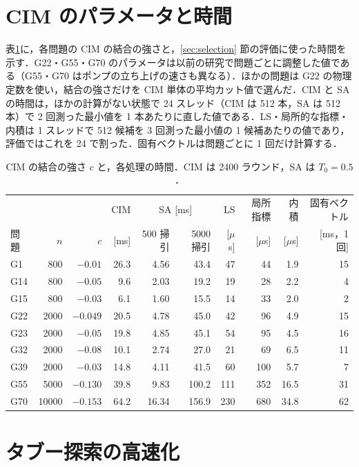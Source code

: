 \appendix

\section{CIM のパラメータと時間}\label{app:timing}

表\ref{tab:timing}に，各問題の CIM の結合の強さと，\ref{sec:selection} 節の評価に使った時間を示す．G22・G55・G70 のパラメータは以前の研究で問題ごとに調整した値である（G55・G70 はポンプの立ち上げの速さも異なる）．ほかの問題は G22 の物理定数を使い，結合の強さだけを CIM 単体の平均カット値で選んだ．CIM と SA の時間は，ほかの計算がない状態で 24 スレッド（CIM は 512 本，SA は 512 本）で 2 回測った最小値を 1 本あたりに直した値である．LS・局所的な指標・内積は 1 スレッドで 512 候補を 3 回測った最小値の 1 候補あたりの値であり，評価ではこれを 24 で割った．固有ベクトルは問題ごとに 1 回だけ計算する．

\begin{table}[h]
\centering
\caption{CIM の結合の強さ $c$ と，各処理の時間．CIM は 2400 ラウンド，SA は $T_0=0.5$．}\label{tab:timing}
\small
\begin{tabular}{lrrrrrrrrr}
\toprule
 & & & CIM & \multicolumn{2}{c}{SA [ms]} & LS & 局所指標 & 内積 & 固有ベクトル \\
問題 & $n$ & $c$ & [ms] & 500 掃引 & 5000 掃引 & [$\mu$s] & [$\mu$s] & [$\mu$s] & [ms，1 回] \\
\midrule
G1 & 800 & $-0.01$ & 26.3 & 4.56 & 43.4 & 47 & 44 & 1.9 & 15 \\
G14 & 800 & $-0.05$ & 9.6 & 2.03 & 19.2 & 19 & 28 & 2.2 & 4 \\
G15 & 800 & $-0.03$ & 6.1 & 1.60 & 15.5 & 14 & 33 & 2.0 & 2 \\
G22 & 2000 & $-0.049$ & 20.5 & 4.78 & 45.0 & 42 & 96 & 4.9 & 15 \\
G23 & 2000 & $-0.05$ & 19.8 & 4.85 & 45.1 & 54 & 95 & 4.5 & 16 \\
G32 & 2000 & $-0.08$ & 10.1 & 2.74 & 27.0 & 21 & 69 & 6.5 & 11 \\
G39 & 2000 & $-0.03$ & 14.8 & 4.11 & 41.5 & 60 & 100 & 5.7 & 7 \\
G55 & 5000 & $-0.130$ & 39.8 & 9.83 & 100.2 & 111 & 352 & 16.5 & 31 \\
G70 & 10000 & $-0.153$ & 64.2 & 16.34 & 156.9 & 230 & 680 & 34.8 & 62 \\
\bottomrule
\end{tabular}
\end{table}

\section{タブー探索の高速化}\label{app:tabu}

